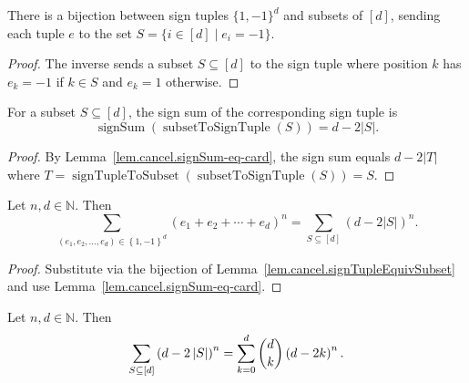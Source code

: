 \begin{lemma}
\label{lem.cancel.signTupleEquivSubset}
\leanhelper
\leanok
There is a bijection between sign tuples $\{1,-1\}^d$ and subsets of $[d]$,
sending each tuple $e$ to the set $S = \{i \in [d] \mid e_i = -1\}$.
\end{lemma}

\begin{proof}
\leanok
The inverse sends a subset $S \subseteq [d]$ to the sign tuple where
position $k$ has $e_k = -1$ if $k \in S$ and $e_k = 1$ otherwise.
\end{proof}

\begin{lemma}
\label{lem.cancel.signSum-subsetToSignTuple}
\leanhelper
\leanok
For a subset $S \subseteq [d]$, the sign sum of the corresponding sign tuple is
\[
\operatorname{signSum}(\operatorname{subsetToSignTuple}(S)) = d - 2|S|.
\]
\end{lemma}

\begin{proof}
\leanok
By Lemma~\ref{lem.cancel.signSum-eq-card}, the sign sum equals $d - 2|T|$
where $T = \operatorname{signTupleToSubset}(\operatorname{subsetToSignTuple}(S)) = S$.
\end{proof}

\begin{lemma}
\label{lem.cancel.sum-signSum-pow-eq-sum-subset}
\leanhelper
\leanok
Let $n,d\in\mathbb{N}$. Then
\[
\sum_{\left(  e_{1},e_{2},\ldots,e_{d}\right)  \in\left\{  1,-1\right\}  ^{d}%
}\left(  e_{1}+e_{2}+\cdots+e_{d}\right)  ^{n}=\sum_{S\subseteq\left[
d\right]  }\left(  d-2\left\vert S\right\vert \right)  ^{n}.
\]
\end{lemma}

\begin{proof}
\leanok
Substitute via the bijection of Lemma~\ref{lem.cancel.signTupleEquivSubset}
and use Lemma~\ref{lem.cancel.signSum-eq-card}.
\end{proof}

\begin{lemma}
\label{lem.cancel.sum-subset-eq-sum-choose}
\leanhelper
\leanok
Let $n,d\in\mathbb{N}$. Then
\[
\sum_{S\subseteq\left[  d\right]  }\left(  d-2\left\vert S\right\vert
\right)  ^{n} = \sum_{k=0}^{d}\dbinom{d}{k}\left(  d-2k\right)  ^{n}.
\]
\end{lemma}

